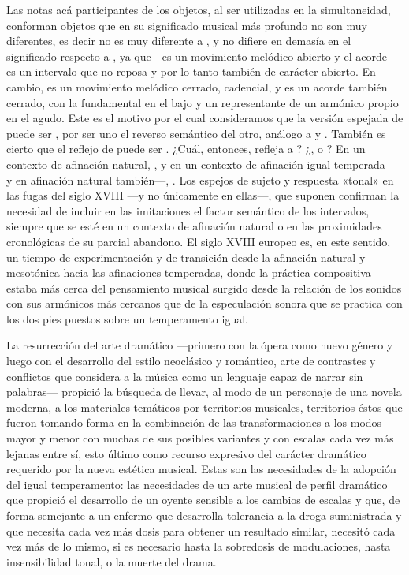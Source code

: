\documentclass[a4paper,12pt]{article}
\begin{document}
\begin{multicols}{2}
Las notas acá participantes de los objetos, al ser utilizadas en la simultaneidad, conforman objetos que en su significado musical más profundo no son muy diferentes, es decir  no es muy diferente a \hbox{,} y  no difiere en demasía en el significado respecto a \hbox{,} ya que - es un movimiento melódico abierto y el acorde - es un intervalo que no reposa y por lo tanto también de carácter abierto. En cambio,  es un movimiento melódico cerrado, cadencial, y  es un acorde también cerrado, con la fundamental en el bajo y un representante de un armónico propio en el agudo. Este es el motivo por el cual consideramos que la versión espejada de  puede ser , por ser uno el reverso semántico del otro, análogo a  y \hbox{.} También es cierto que el reflejo de  puede ser \hbox{.} ¿Cuál, entonces, refleja a \hbox{?} ¿\hbox{,} o \hbox{?} En un contexto de afinación natural, \hbox{,} y en un contexto de afinación igual temperada ---y en afinación natural también---, \hbox{.} Los espejos de sujeto y respuesta «tonal» en las fugas del siglo XVIII ---y no únicamente en ellas---, que suponen  confirman la necesidad de incluir en las imitaciones el factor semántico de los intervalos, siempre que se esté en un contexto de afinación natural o en las proximidades cronológicas de su parcial abandono. El siglo XVIII europeo es, en este sentido, un tiempo de experimentación y de transición desde la afinación natural y mesotónica hacia las afinaciones temperadas, donde la práctica compositiva estaba más cerca del pensamiento musical surgido desde la relación de los sonidos con sus armónicos más cercanos que de la especulación sonora que se practica con los dos pies puestos sobre un temperamento igual.

La resurrección del arte dramático ---primero con la ópera como nuevo género y luego con el desarrollo del estilo neoclásico y romántico, arte de contrastes y conflictos que considera a la música como un lenguaje capaz de narrar sin palabras--- propició la búsqueda de llevar, al modo de un personaje de una novela moderna, a los materiales temáticos por territorios musicales, territorios éstos que fueron tomando forma en la combinación de las transformaciones a los modos mayor y menor con muchas de sus posibles variantes y con escalas cada vez más lejanas entre sí, esto último como recurso expresivo del carácter dramático requerido por la nueva estética musical. Estas son las necesidades de la adopción del igual temperamento: las necesidades de un arte musical de perfil dramático que propició el desarrollo de un oyente sensible a los cambios de escalas y que, de forma semejante a un enfermo que desarrolla tolerancia a la droga suministrada y que necesita cada vez más dosis para obtener un resultado similar, necesitó cada vez más de lo mismo, si es necesario hasta la sobredosis de modulaciones, hasta insensibilidad tonal, o la muerte del drama.


\end{multicols}
\end{document}
